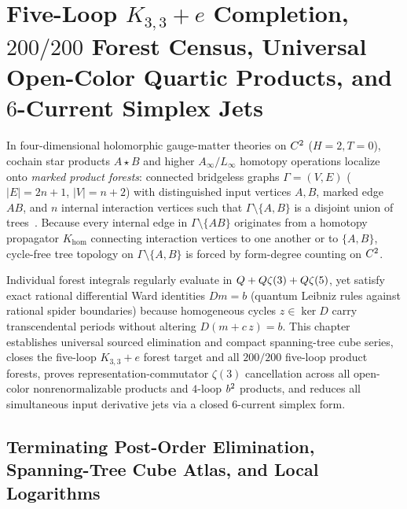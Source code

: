 \section{Five-Loop \texorpdfstring{$K_{3,3}+e$}{K\_\{3,3\}+e} Completion, \texorpdfstring{$200/200$}{200/200} Forest Census, Universal Open-Color Quartic Products, and \texorpdfstring{$6$}{6}-Current Simplex Jets}
\label{sec:forests-quartic-jets}

In four-dimensional holomorphic gauge-matter theories on $C^2$ ($H=2, T=0$), cochain star products $A \star B$ and higher $A_\infty / L_\infty$ homotopy operations localize onto \emph{marked product forests}: connected bridgeless graphs $\Gamma = (V,E)$ ($|E| = 2n+1$, $|V| = n+2$) with distinguished input vertices $A,B$, marked edge $AB$, and $n$ internal interaction vertices such that $\Gamma\setminus\{A,B\}$ is a disjoint union of trees~\cite{BGKWY,GKW,LLC,Repo9e833c8}. Because every internal edge in $\Gamma\setminus\{AB\}$ originates from a homotopy propagator $K_{\mathrm{hom}}$ connecting interaction vertices to one another or to $\{A,B\}$, cycle-free tree topology on $\Gamma\setminus\{A,B\}$ is forced by form-degree counting on $C^2$.

Individual forest integrals regularly evaluate in $Q + Q\zeta(3) + Q\zeta(5)$, yet satisfy exact rational differential Ward identities $D m = b$ (quantum Leibniz rules against rational spider boundaries) because homogeneous cycles $z \in \ker D$ carry transcendental periods without altering $D(m + c\,z) = b$. This chapter establishes universal sourced elimination and compact spanning-tree cube series, closes the five-loop $K_{3,3}+e$ forest target and all $200/200$ five-loop product forests, proves representation-commutator $\zeta(3)$ cancellation across all open-color nonrenormalizable products and $4$-loop $b^2$ products, and reduces all simultaneous input derivative jets via a closed $6$-current simplex form.

\subsection{Terminating Post-Order Elimination, Spanning-Tree Cube Atlas, and Local Logarithms}
\label{subsec:forest-cube-atlas}

